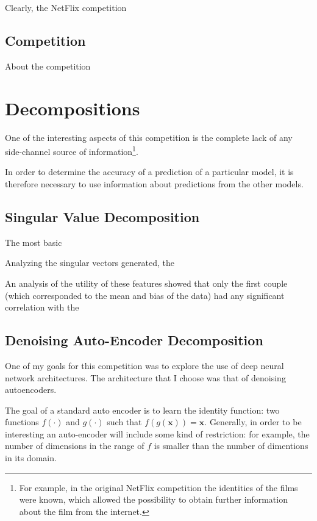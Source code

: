 \documentclass{article}
\begin{document}
Clearly, the NetFlix competition 


\subsection{Competition}

About the competition

\section{Decompositions}

One of the interesting aspects of this competition is the complete lack of any
side-channel source of information\footnote{For example, in the original NetFlix
competition the identities of the films were known, which allowed the
possibility to obtain further information about the film from the internet.}.

In order to determine the accuracy of a prediction of a particular model, it is
therefore necessary to use information about predictions from the other models.

\subsection{Singular Value Decomposition}

The most basic

Analyzing the singular vectors generated, the 


An analysis of the utility of these features showed that only the first couple
(which corresponded to the mean and bias of the data) had any significant
correlation with the 

\subsection{Denoising Auto-Encoder Decomposition}

One of my goals for this competition was to explore the use of deep neural network architectures.  The architecture that I choose was that of denoising autoencoders.

The goal of a standard auto encoder is to learn the identity function: two functions $f(\cdot)$ and $g(\cdot)$ such that $f(g(\mathbf{x})) = \mathbf{x}$.  Generally, in order to be interesting an auto-encoder will include some kind of restriction: for example, the number of dimensions in the range of $f$ is smaller than the number of dimentions in its domain.
\end{document}
